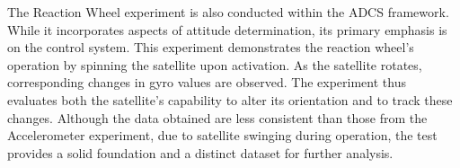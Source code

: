 The Reaction Wheel experiment is also conducted within the ADCS framework. While it incorporates aspects of attitude determination, its primary emphasis is on the control system. This experiment demonstrates the reaction wheel's operation by spinning the satellite upon activation. As the satellite rotates, corresponding changes in gyro values are observed. The experiment thus evaluates both the satellite’s capability to alter its orientation and to track these changes. Although the data obtained are less consistent than those from the Accelerometer experiment, due to satellite swinging during operation, the test provides a solid foundation and a distinct dataset for further analysis.